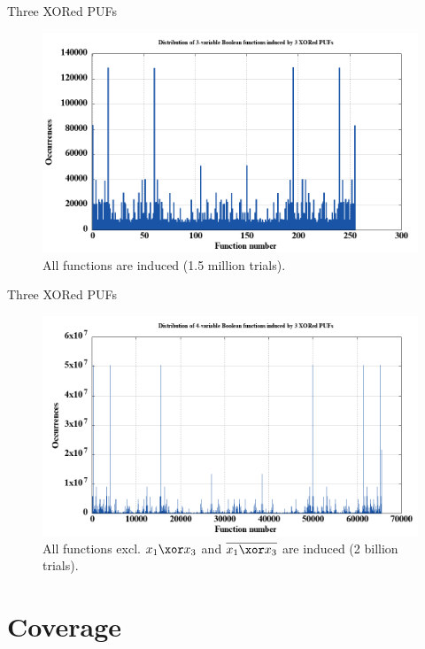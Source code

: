 \documentclass[10pt, compress]{beamer}
\begin{document}
\begin{frame}{Three XORed PUFs}
    \begin{figure}
        \centering
        \includegraphics[width=\textwidth]{figures/dist/distribution_of_3-variable_boolean_functions_induced_by_3_xored_pufs.png}
        \caption{All functions are induced (1.5 million trials).}
    \end{figure}
\end{frame}

\begin{frame}{Three XORed PUFs}
    \begin{figure}
        \centering
        \includegraphics[width=\textwidth]{figures/dist/distribution_of_4-variable_boolean_functions_induced_by_3_xored_pufs.png}
        \caption{All functions excl. $x_1 \xor x_3$ and $\overline{x_1 \xor x_3}$ are induced (2 billion trials).}
    \end{figure}
\end{frame}

\section{Coverage}
\end{document}
